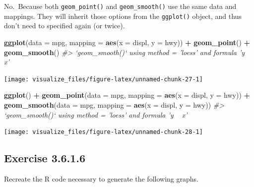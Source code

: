 \documentclass[]{book}
\newenvironment{Shaded}{\begin{snugshade}}{\end{snugshade}}
\newcommand{\CommentTok}[1]{\textcolor[rgb]{0.56,0.35,0.01}{\textit{#1}}}
\newcommand{\DataTypeTok}[1]{\textcolor[rgb]{0.13,0.29,0.53}{#1}}
\newcommand{\KeywordTok}[1]{\textcolor[rgb]{0.13,0.29,0.53}{\textbf{#1}}}
\newcommand{\NormalTok}[1]{#1}
\newcommand{\OperatorTok}[1]{\textcolor[rgb]{0.81,0.36,0.00}{\textbf{#1}}}
\newcommand{\StringTok}[1]{\textcolor[rgb]{0.31,0.60,0.02}{#1}}
\theoremstyle{plain}
\theoremstyle{remark}
\begin{document}
No.~Because both \texttt{geom\_point()} and \texttt{geom\_smooth()} use the same data and mappings. They will inherit those options from the \texttt{ggplot()} object, and thus don't need to specified again (or twice).

\begin{Shaded}
\begin{Highlighting}[]
\KeywordTok{ggplot}\NormalTok{(}\DataTypeTok{data =}\NormalTok{ mpg, }\DataTypeTok{mapping =} \KeywordTok{aes}\NormalTok{(}\DataTypeTok{x =}\NormalTok{ displ, }\DataTypeTok{y =}\NormalTok{ hwy)) }\OperatorTok{+}
\StringTok{  }\KeywordTok{geom_point}\NormalTok{() }\OperatorTok{+}
\StringTok{  }\KeywordTok{geom_smooth}\NormalTok{()}
\CommentTok{#> `geom_smooth()` using method = 'loess' and formula 'y ~ x'}
\end{Highlighting}
\end{Shaded}

\begin{center}\texttt{[image: visualize\_files/figure-latex/unnamed-chunk-27-1]} \end{center}

\begin{Shaded}
\begin{Highlighting}[]
\KeywordTok{ggplot}\NormalTok{() }\OperatorTok{+}
\StringTok{  }\KeywordTok{geom_point}\NormalTok{(}\DataTypeTok{data =}\NormalTok{ mpg, }\DataTypeTok{mapping =} \KeywordTok{aes}\NormalTok{(}\DataTypeTok{x =}\NormalTok{ displ, }\DataTypeTok{y =}\NormalTok{ hwy)) }\OperatorTok{+}
\StringTok{  }\KeywordTok{geom_smooth}\NormalTok{(}\DataTypeTok{data =}\NormalTok{ mpg, }\DataTypeTok{mapping =} \KeywordTok{aes}\NormalTok{(}\DataTypeTok{x =}\NormalTok{ displ, }\DataTypeTok{y =}\NormalTok{ hwy))}
\CommentTok{#> `geom_smooth()` using method = 'loess' and formula 'y ~ x'}
\end{Highlighting}
\end{Shaded}

\begin{center}\texttt{[image: visualize\_files/figure-latex/unnamed-chunk-28-1]} \end{center}

\hypertarget{exercise-3.6.1.6}{%
\subsection*{\texorpdfstring{Exercise {3.6.1.6}}{Exercise 3.6.1.6}}\label{exercise-3.6.1.6}}

Recreate the R code necessary to generate the following graphs.
\end{document}
